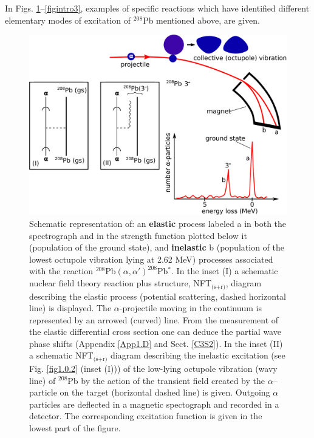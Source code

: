 In Figs. \ref{figintro1}--\ref{figintro3}, examples of specific reactions which have identified different elementary modes of excitation of $^{208}$Pb mentioned above, are given.
\begin{figure}
\centerline {
\includegraphics*[width=15cm]{introduccion/figs/figintro1}
}
\caption{Schematic representation of: an \textbf{elastic} process labeled a in both the spectrograph and in the strength function plotted below it (population of the ground state), and \textbf{inelastic} b (population of the lowest octupole vibration lying at 2.62 MeV) processes associated with the reaction $^{208}$Pb$(\alpha,\alpha')^{208}$Pb$^*$.  In the inset (I) a schematic nuclear field theory reaction plus structure, NFT$_{\text{(s+r)}}$,  diagram describing  the elastic process (potential scattering, dashed horizontal line) is displayed. The $\alpha$-projectile moving in the continuum is represented by an arrowed (curved) line. From the measurement of the elastic differential cross section one can deduce the partial wave phase shifts (Appendix \ref{App1.D} and Sect. \ref{C3S2}). In the inset (II) a schematic NFT$_{\text{(s+r)}}$ diagram describing the inelastic  excitation (see Fig.  \ref{fig1.0.2} (inset (I))) of the low-lying octupole vibration (wavy line) of $^{208}$Pb by the action of the transient field created by the $\alpha$--particle on the target (horizontal dashed line) is given.  Outgoing $\alpha$ particles are deflected in a magnetic spectograph and recorded in a detector. The corresponding excitation function is given in the lowest part of the figure.}
\label{figintro1}
\end{figure}
